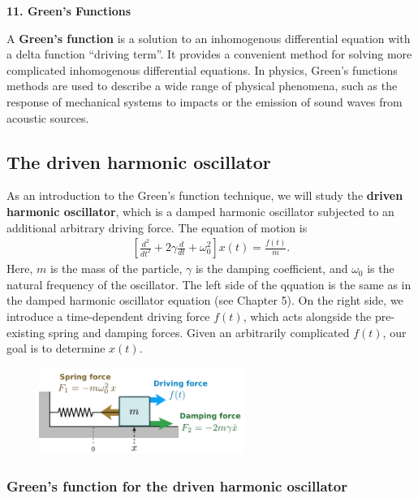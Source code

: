 \documentclass[10pt,a4paper]{article}
\begin{document}
\setcounter{page}{90}

\noindent
{\Large \textbf{11. Green's Functions}}
\vskip 0.2in

\label{greens-functions}

A \textbf{Green's function} is a solution to an inhomogenous
differential equation with a delta function ``driving term''.  It
provides a convenient method for solving more complicated inhomogenous
differential equations.  In physics, Green's functions methods are
used to describe a wide range of physical phenomena, such as the
response of mechanical systems to impacts or the emission of sound
waves from acoustic sources.

\subsection{The driven harmonic oscillator}
\label{the-driven-harmonic-oscillator}

As an introduction to the Green's function technique, we will study
the \textbf{driven harmonic oscillator}, which is a damped harmonic
oscillator subjected to an additional arbitrary driving force.  The
equation of motion is
\begin{align}
  \left[\frac{d^2}{dt^2} + 2 \gamma \frac{d}{dt} + \omega_0^2\right] x(t) = \frac{f(t)}{m}.
\end{align}
Here, $m$ is the mass of the particle, $\gamma$ is the damping
coefficient, and $\omega_0$ is the natural frequency of the
oscillator. The left side of the qquation is the same as in the damped
harmonic oscillator equation (see Chapter 5). On the right side, we
introduce a time-dependent driving force $f(t)$, which acts alongside
the pre-existing spring and damping forces. Given an arbitrarily
complicated $f(t)$, our goal is to determine $x(t)$.

\begin{figure}[ht]
  \centering\includegraphics[width=0.6\textwidth]{oscillator_driven}
\end{figure}

\subsubsection{Green's function for the driven harmonic oscillator}
\label{greens-function-for-the-driven-harmonic-oscillator}
\end{document}
